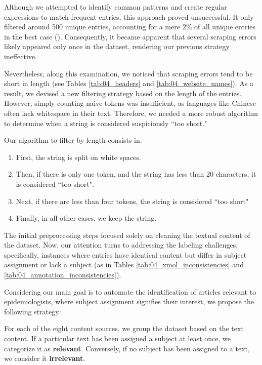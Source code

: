 Although we attempted to identify common patterns and create regular expressions to match frequent entries, this approach proved unsuccessful. It only filtered around 500 unique entries, accounting for a mere $2\%$ of all unique entries in the best case (\trafilaturaAbstract{}). Consequently, it became apparent that several scraping errors likely appeared only once in the dataset, rendering our previous strategy ineffective.

Nevertheless, along this examination, we noticed that scraping errors tend to be short in length (see Tables \ref{tab:04_headers} and \ref{tab:04_website_names}). As a result, we devised a new filtering strategy based on the length of the entries. However, simply counting naive tokens was insufficient, as languages like Chinese often lack whitespace in their text. Therefore, we needed a more robust algorithm to determine when a string is considered suspiciously ``too short."

Our algorithm to filter by length consists in:

\begin{enumerate}
    \item First, the string is split on white spaces.
    \item Then, if there is only one token, and the string has less than 20 characters, it is considered ``too short".
    \item Next, if there are less than four tokens, the string is considered ``too short"
    \item Finally, in all other cases, we keep the string.
\end{enumerate}


\label{vsi_resolving_inconsistencies}

The initial preprocessing steps focused solely on cleaning the textual content of the dataset. Now, our attention turns to addressing the labeling challenges, specifically, instances where entries have identical content but differ in subject assignment or lack a subject (as in Tables \ref{tab:04_xmol_inconsistencies} and \ref{tab:04_annotation_inconsistencies}).

Considering our main goal is to automate the identification of articles relevant to epidemiologists, where subject assignment signifies their interest, we propose the following strategy:

\begin{tcolorbox}[colback=mylightblue,colframe=gray!50!black]
For each of the eight content sources, we group the dataset based on the text content. If a particular text has been assigned a subject at least once, we categorize it as \textbf{relevant}. Conversely, if no subject has been assigned to a text, we consider it \textbf{irrelevant}.
\end{tcolorbox}

